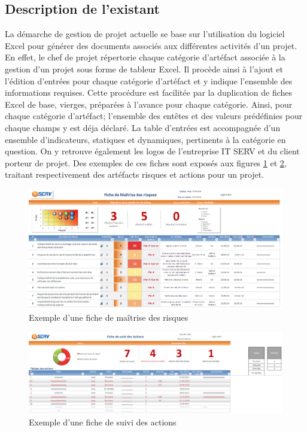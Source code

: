 \begin{spacing}{1.5}
\subsection{Description de l'existant}
La démarche de gestion de projet actuelle se base sur l'utilisation du logiciel Excel pour générer des documents associés aux différentes activités d'un projet. En effet, le chef de projet répertorie chaque catégorie d'artéfact associée à la gestion d'un projet sous forme de tableur Excel. Il procède ainsi à l'ajout et l'édition d'entrées pour chaque catégorie d'artéfact et y indique l'ensemble des informations requises. Cette procédure est facilitée par la duplication de fiches Excel de base, vierges, préparées à l'avance pour chaque catégorie. Ainsi, pour chaque catégorie d'artéfact; l'ensemble des entêtes et des valeurs prédéfinies pour chaque champs y est déja déclaré. La table d'entrées est accompagnée d'un ensemble d'indicateurs, statiques et dynamiques, pertinents à la catégorie en question. On y retrouve également les logos de l'entreprise IT SERV et du client porteur de projet. Des exemples de ces fiches sont exposés aux figures \ref{fig:risqueFiche} et \ref{fig:actionFiche}, traitant respectivement des artéfacts risques et actions pour un projet.

\begin{figure}[H]
\centering
\includegraphics[width=\textwidth]{ficheRisques.png}
\caption{Exemple d'une fiche de maîtrise des risques}
\label{fig:risqueFiche}
\end{figure}

\begin{figure}[H]
\centering
\includegraphics[width=\textwidth]{ficheActions.png}
\caption{Exemple d'une fiche de suivi des actions}
\label{fig:actionFiche}
\end{figure}
\


\end{spacing}
